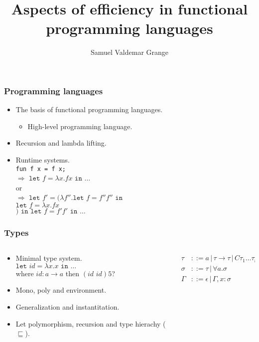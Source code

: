 \documentclass{beamer}
\title{Aspects of efficiency in functional programming languages}
\author{Samuel Valdemar Grange}
\institute{Department of Mathematics and Computer Science (IMADA)}
\date{}
\begin{document}
\frame{\titlepage}

\begin{frame}
\frametitle{Programming languages}
\begin{itemize}
    \item The basis of functional programming languages.
    \begin{itemize}
        \item High-level programming language.
    \end{itemize}
    \item Recursion and lambda lifting.
    \item Runtime systems.\\
    \texttt{fun f x = f x;}\\
    $\Rightarrow$ $\texttt{let } f = \lambda x.f x \texttt{ in } \dots$
    \\or\\
    $\Rightarrow$ $\texttt{let } f' = (\lambda f''. \texttt{let } f = f'' f'' \texttt{ in }$\\
    \hspace*{1cm}$\texttt{let } f = \lambda x.f x$\\
    $) \texttt{ in } \texttt{let } f = f' f' \texttt{ in } \dots$
\end{itemize}
\end{frame}

\begin{frame}
\frametitle{Types}
\begin{columns}
    \begin{column}{0.6\textwidth}
        \begin{itemize}
            \item Minimal type system.\\
            $\texttt{let } id = \lambda x.x \texttt{ in } \dots$\\
            where $id: a \rightarrow a$ then $(id \,\, id) 5$?
            \item Mono, poly and environment.
            \item Generalization and instantitation.
            \item Let polymorphism, recursion and type hierachy ($\sqsubseteq$).
        \end{itemize}
    \end{column}
    
    \begin{column}{0.4\textwidth}
        \begin{align}
        \tau &::= a \,|\, \tau \rightarrow \tau \,|\, C\tau_1 \dots \tau_n \tag*{}\\
        \sigma &::= \tau \,|\, \forall a.\sigma \tag*{}\\
        \Gamma &::= \epsilon \,|\, \Gamma, x: \sigma \tag*{}
        \end{align}
    \end{column}
\end{columns}
\end{frame}
\end{document}
